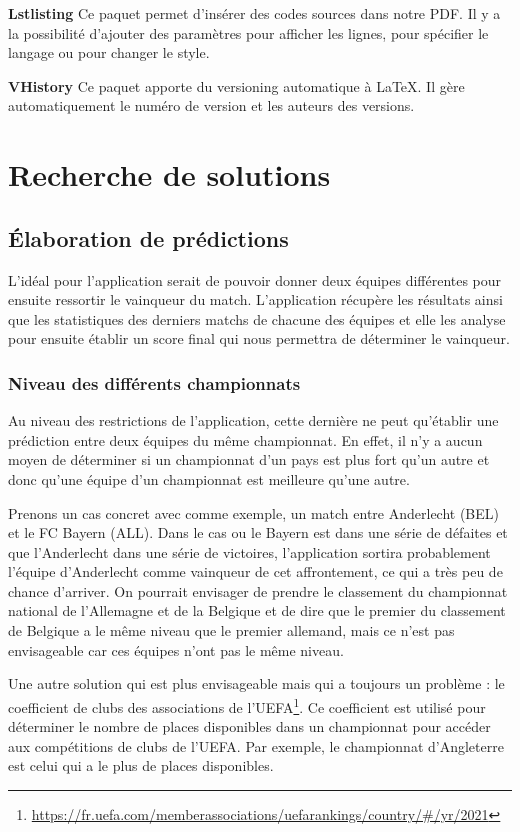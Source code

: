 \documentclass[a4paper,14pt]{extarticle}
\begin{document}
{\noindent\textbf{Lstlisting}
Ce paquet permet d'insérer des codes sources dans notre PDF. Il y a la possibilité d'ajouter des paramètres pour afficher les lignes, pour spécifier le langage ou pour changer le style.

\noindent\textbf{VHistory}
Ce paquet apporte du versioning automatique à \LaTeX. Il gère automatiquement le numéro de version et les auteurs des versions.

\section{Recherche de solutions}

\subsection{Élaboration de prédictions}

L'idéal pour l'application serait de pouvoir donner deux équipes différentes pour ensuite ressortir le vainqueur du match. L'application récupère les résultats ainsi que les statistiques des derniers matchs de chacune des équipes et elle les analyse pour ensuite établir un score final qui nous permettra de déterminer le vainqueur.


\subsubsection{Niveau des différents championnats}
\label{niveauDifferentChampionnats}
Au niveau des restrictions de l'application, cette dernière ne peut qu'établir une prédiction entre deux équipes du même championnat. En effet, il n'y a aucun moyen de déterminer si un championnat d'un pays est plus fort qu'un autre et donc qu'une équipe d'un championnat est meilleure qu'une autre. 

Prenons un cas concret avec comme exemple, un match entre Anderlecht (BEL) et le FC Bayern (ALL). Dans le cas ou le Bayern est dans une série de défaites et que l'Anderlecht dans une série de victoires, l'application sortira probablement l'équipe d'Anderlecht comme vainqueur de cet affrontement, ce qui a très peu de chance d'arriver. 
On pourrait envisager de prendre le classement du championnat national de l'Allemagne et de la Belgique et de dire que le premier du classement de Belgique a le même niveau que le premier allemand, mais ce n'est pas envisageable car ces équipes n'ont pas le même niveau.  

Une autre solution qui est plus envisageable mais qui a toujours un problème : le coefficient de clubs des associations de l'UEFA\footnote{\url{https://fr.uefa.com/memberassociations/uefarankings/country/\#/yr/2021}}. Ce coefficient est utilisé pour déterminer le nombre de places disponibles dans un championnat pour accéder aux compétitions de clubs de l'UEFA. Par exemple, le championnat d'Angleterre est celui qui a le plus de places disponibles.

}
\end{document}
